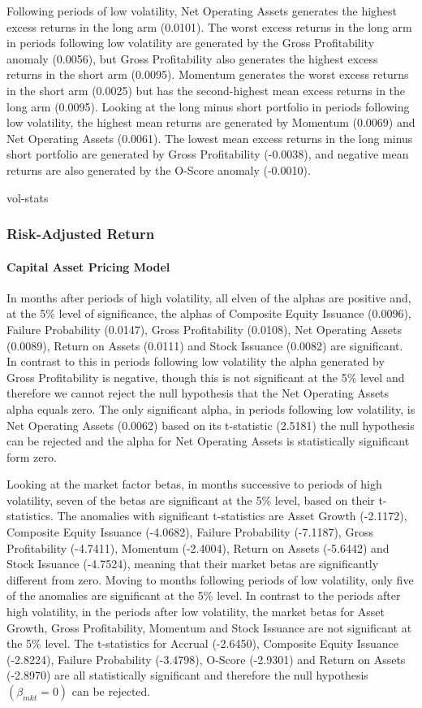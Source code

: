 \documentclass[12pt, a4paper, oneside]{article}
\begin{document}
Following periods of low volatility, Net Operating Assets generates the highest excess returns in the long arm (0.0101). The worst excess returns in the long arm in periods following low volatility are generated by the Gross Profitability anomaly (0.0056), but Gross Profitability also generates the highest excess returns in the short arm (0.0095).  Momentum generates the worst excess returns in the short arm (0.0025) but has the second-highest mean excess returns in the long arm (0.0095). Looking at the long minus short portfolio in periods following low volatility, the highest mean returns are generated by Momentum (0.0069) and Net Operating Assets (0.0061). The lowest mean excess returns in the long minus short portfolio are generated by Gross Profitability (-0.0038), and negative mean returns are also generated by the O-Score anomaly (-0.0010).

{vol-stats}

\subsubsection{Risk-Adjusted Return}
\paragraph{Capital Asset Pricing Model}
In months after periods of high volatility, all elven of the alphas are positive and, at the 5\% level of significance, the alphas of Composite Equity Issuance (0.0096), Failure Probability (0.0147), Gross Profitability (0.0108), Net Operating Assets (0.0089), Return on Assets (0.0111) and Stock Issuance (0.0082) are significant. In contrast to this in periods following low volatility the alpha generated by Gross Profitability is negative, though this is not significant at the 5\% level and therefore we cannot reject the null hypothesis that the Net Operating Assets alpha equals zero. The only significant alpha, in periods following low volatility, is Net Operating Assets (0.0062) based on its t-statistic (2.5181) the null hypothesis can be rejected and the alpha for Net Operating Assets is statistically significant form zero. 

Looking at the market factor betas, in months successive to periods of high volatility, seven of the betas are significant at the 5\% level, based on their t-statistics. The anomalies with significant t-statistics are Asset Growth (-2.1172), Composite Equity Issuance (-4.0682), Failure Probability (-7.1187), Gross Profitability (-4.7411), Momentum (-2.4004), Return on Assets (-5.6442) and Stock Issuance (-4.7524), meaning that their market betas are significantly different from zero. Moving to months following periods of low volatility, only five of the anomalies are significant at the 5\% level. In contrast to the periods after high volatility, in the periods after low volatility, the market betas for Asset Growth, Gross Profitability, Momentum and Stock Issuance are not significant at the 5\% level. The t-statistics for Accrual (-2.6450), Composite Equity Issuance (-2.8224), Failure Probability (-3.4798), O-Score (-2.9301) and Return on Assets (-2.8970) are all statistically significant and therefore the null hypothesis $(\beta_{mkt}= 0)$ can be rejected.
\end{document}
